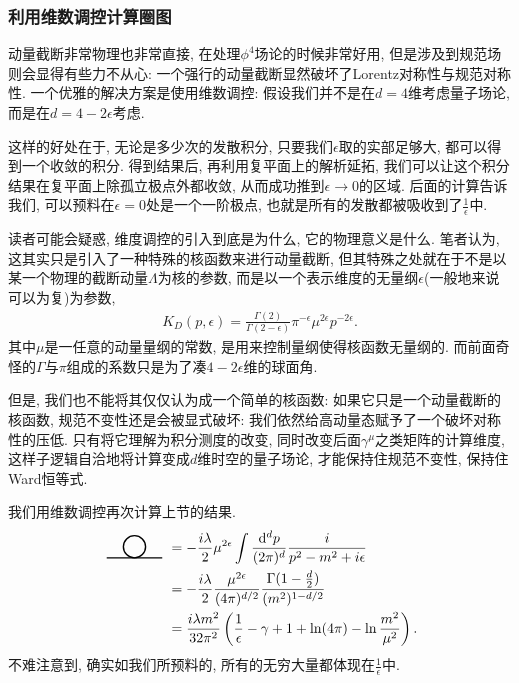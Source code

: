 \subsubsection{利用维数调控计算圈图}
动量截断非常物理也非常直接, 在处理$\phi^4$场论的时候非常好用, 但是涉及到规范场则会显得有些力不从心: 一个强行的动量截断显然破坏了Lorentz对称性与规范对称性. 一个优雅的解决方案是使用维数调控: 假设我们并不是在$d=4$维考虑量子场论, 而是在$d=4-2\epsilon$考虑.

这样的好处在于, 无论是多少次的发散积分, 只要我们$\epsilon$取的实部足够大, 都可以得到一个收敛的积分. 得到结果后, 再利用复平面上的解析延拓, 我们可以让这个积分结果在复平面上除孤立极点外都收敛, 从而成功推到$\epsilon\to0$的区域. 后面的计算告诉我们, 可以预料在$\epsilon=0$处是一个一阶极点, 也就是所有的发散都被吸收到了$\frac1\epsilon$中.

读者可能会疑惑, 维度调控的引入到底是为什么, 它的物理意义是什么. 笔者认为, 这其实只是引入了一种特殊的核函数来进行动量截断, 但其特殊之处就在于不是以某一个物理的截断动量$\Lambda$为核的参数, 而是以一个表示维度的无量纲$\epsilon$(一般地来说可以为复)为参数, 
\begin{align}
    K_D(p, \epsilon)=\frac{\Gamma(2)}{\Gamma(2-\epsilon)}\pi^{-\epsilon}\mu^{2\epsilon}p^{-2\epsilon}.
\end{align}
其中$\mu$是一任意的动量量纲的常数, 是用来控制量纲使得核函数无量纲的. 而前面奇怪的$\Gamma$与$\pi$组成的系数只是为了凑$4-2\epsilon$维的球面角. 

但是, 我们也不能将其仅仅认为成一个简单的核函数: 如果它只是一个动量截断的核函数, 规范不变性还是会被显式破坏: 我们依然给高动量态赋予了一个破坏对称性的压低. 只有将它理解为积分测度的改变, 同时改变后面$\gamma^\mu$之类矩阵的计算维度, 这样子逻辑自洽地将计算变成$d$维时空的量子场论, 才能保持住规范不变性, 保持住Ward恒等式.

我们用维数调控再次计算上节的结果.
\begin{align}
    \vcenter{\hbox{
        \begin{tikzpicture}[line width=1pt, scale=0.7, baseline=-0.1cm]
            \draw (-1,0) -- (1,0);
            \draw (0,0.4) circle (0.4);
        \end{tikzpicture}
    }}&=-\frac{i\lambda}2\mu^{2\epsilon}\int\nd d p\frac i{p^2-m^2+i\epsilon}\\
    &=-\frac{i\lambda}{2}\frac{\mu^{2\epsilon}}{(4\pi)^{d/2}}\frac{\Gamma(1-\frac d2)}{(m^2)^{1-d/2}}\\
    &=\frac{i\lambda m^2}{32\pi^2}\left(\frac1\epsilon-\gamma+1+\ln(4\pi)-\ln\frac{m^2}{\mu^2}\right).
\end{align}
不难注意到, 确实如我们所预料的, 所有的无穷大量都体现在$\frac1\epsilon$中.


